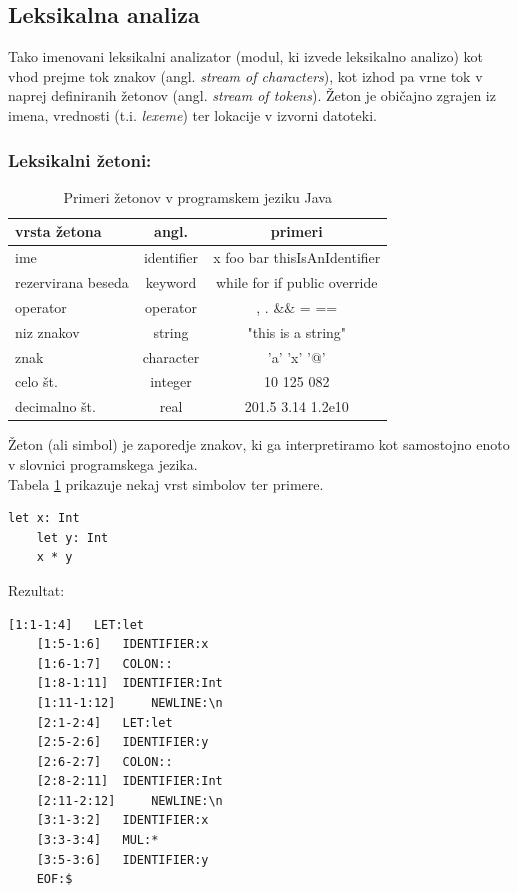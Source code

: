 \documentclass[a4paper, 12pt]{book}
\begin{document}
\subsection{Leksikalna analiza}

Tako imenovani leksikalni analizator (modul, ki izvede leksikalno analizo) kot vhod prejme tok znakov (angl. \textit{stream of characters}), kot izhod pa vrne tok v naprej definiranih žetonov (angl. \textit{stream of tokens}). Žeton je običajno zgrajen iz imena, vrednosti (t.i. \textit{lexeme}) ter lokacije v izvorni datoteki.  \cite{modernCompiler}

\subsubsection{Leksikalni žetoni:}
\begin{table}
	\begin{center}
		\begin{tabular}{l|c|c}
			\textbf{vrsta žetona} & \textbf{angl.} & \textbf{primeri} \\ \hline\hline
			ime & identifier & x	foo		bar		thisIsAnIdentifier \\
			rezervirana beseda & keyword & while	for		if		public	override \\
			operator & operator & , 	. 		\&\& 	=		== \\
			niz znakov & string & "this is a string" \\
			znak & character & 'a' 		'x' 	'@' \\
			celo št. & integer & 10 	125 	082 \\
			decimalno št. & real & 201.5 	3.14	1.2e10
		\end{tabular}
	\end{center}
	\caption{Primeri žetonov v programskem jeziku Java}
	\label{tabel:vrsteZetonov}
\end{table}
Žeton (ali simbol) je zaporedje znakov, ki ga interpretiramo kot samostojno enoto v slovnici programskega jezika. \cite{modernCompiler}\\ 
Tabela \ref{tabel:vrsteZetonov} prikazuje nekaj vrst simbolov ter primere.\\
\newpage
\begin{lstlisting}[caption={Primer programa v programskem jeziku Atheris},label={lst:atherisCode}, captionpos=b]
	let x: Int
	let y: Int
	x * y
\end{lstlisting}
Rezultat:
\begin{lstlisting}[caption={Rezultat leksikalne analize za program ~\ref{lst:atherisCode}},captionpos=b]
	[1:1-1:4] 	LET:let
	[1:5-1:6] 	IDENTIFIER:x
	[1:6-1:7] 	COLON::
	[1:8-1:11] 	IDENTIFIER:Int
	[1:11-1:12] 	NEWLINE:\n
	[2:1-2:4] 	LET:let
	[2:5-2:6] 	IDENTIFIER:y
	[2:6-2:7] 	COLON::
	[2:8-2:11] 	IDENTIFIER:Int
	[2:11-2:12] 	NEWLINE:\n
	[3:1-3:2] 	IDENTIFIER:x
	[3:3-3:4] 	MUL:*
	[3:5-3:6] 	IDENTIFIER:y
	EOF:$
\end{lstlisting}
\end{document}
